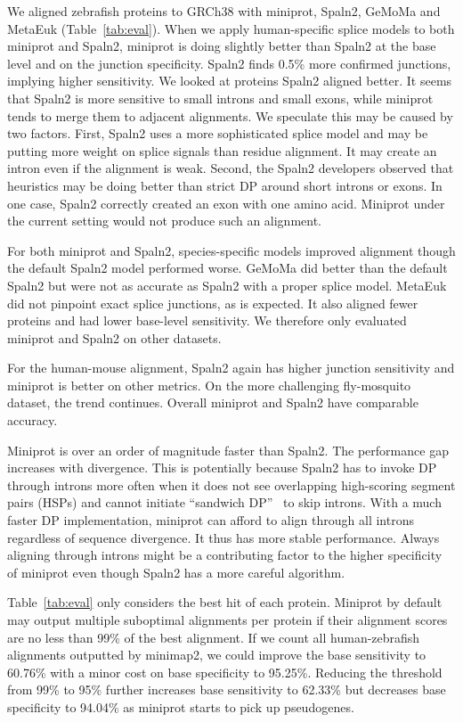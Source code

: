 \documentclass{bioinfo}
\begin{document}
We aligned zebrafish proteins to GRCh38 with miniprot, Spaln2, GeMoMa and MetaEuk
(Table~\ref{tab:eval}). When we apply human-specific splice models to both
miniprot and Spaln2, miniprot is doing slightly better than Spaln2 at the base
level and on the junction specificity. Spaln2 finds 0.5\% more confirmed junctions,
implying higher sensitivity. We looked at proteins Spaln2 aligned better. It
seems that Spaln2 is more sensitive to small introns and small exons, while
miniprot tends to merge them to adjacent alignments. We speculate this may be
caused by two factors. First, Spaln2 uses a more sophisticated splice model and
may be putting more weight on splice signals than residue alignment. It may
create an intron even if the alignment is weak. Second, the Spaln2 developers
observed that heuristics may be doing better than strict DP around short
introns or exons. In one case, Spaln2 correctly created an exon with one amino
acid. Miniprot under the current setting would not produce such an alignment.

For both miniprot and Spaln2, species-specific models improved alignment though
the default Spaln2 model performed worse. GeMoMa did better than the default
Spaln2 but were not as accurate as Spaln2 with a proper splice model. MetaEuk
did not pinpoint exact splice junctions, as is expected. It also aligned fewer
proteins and had lower base-level sensitivity. We therefore only evaluated
miniprot and Spaln2 on other datasets.

For the human-mouse alignment, Spaln2 again has higher junction sensitivity and
miniprot is better on other metrics. On the more challenging fly-mosquito
dataset, the trend continues. Overall miniprot and Spaln2 have comparable
accuracy.

Miniprot is over an order of magnitude faster than Spaln2. The performance gap
increases with divergence. This is potentially because Spaln2 has to invoke DP
through introns more often when it does not see overlapping high-scoring
segment pairs (HSPs) and cannot initiate ``sandwich DP''~\citep{Wu:2005vn} to
skip introns. With a much faster DP implementation, miniprot can afford to
align through all introns regardless of sequence divergence. It thus has more
stable performance. Always aligning through introns might be a contributing
factor to the higher specificity of miniprot even though Spaln2 has a more
careful algorithm.

Table~\ref{tab:eval} only considers the best hit of each protein. Miniprot by
default may output multiple suboptimal alignments per protein if their
alignment scores are no less than 99\% of the best alignment. If we count all
human-zebrafish alignments outputted by minimap2, we could improve the base
sensitivity to 60.76\% with a minor cost on base specificity to 95.25\%.
Reducing the threshold from 99\% to 95\% further increases base sensitivity to
62.33\% but decreases base specificity to 94.04\% as miniprot starts to pick up
pseudogenes.
\end{document}
